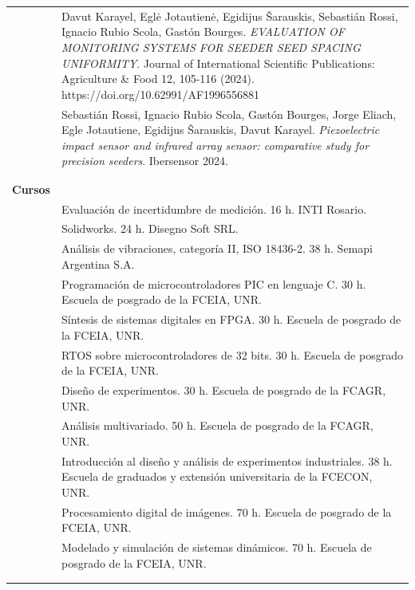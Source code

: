\documentclass[a4paper,10pt, sans]{article}
\begin{document}
  
  \begin{table}[H]
  \centering
  \begin{tabularx}{\textwidth}{r X}  
     
      {} & Davut Karayel, Eglė Jotautienė, Egidijus Šarauskis, Sebastián Rossi, Ignacio Rubio Scola, Gastón Bourges. \textit{EVALUATION OF MONITORING SYSTEMS FOR SEEDER SEED SPACING UNIFORMITY}. Journal of International Scientific Publications: Agriculture \& Food 12, 105-116 (2024). https://doi.org/10.62991/AF1996556881  \\  [1ex]
      {} & Sebastián Rossi, Ignacio Rubio Scola, Gastón Bourges, Jorge Eliach, Egle Jotautiene,
Egidijus Šarauskis, Davut Karayel. \textit{Piezoelectric impact sensor and infrared array sensor:
comparative study for precision seeders}. Ibersensor 2024. \\ \\ \hline \\
    

\textbf{Cursos} & {}\\ [1ex]
    
      {} & Evaluación de incertidumbre de medición. 16 h. INTI Rosario. \\ 
      {} & Solidworks. 24 h. Disegno Soft SRL. \\
      {} & Análisis de vibraciones, categoría II, ISO 18436-2. 38 h. Semapi Argentina S.A.\\
      {} & Programación de microcontroladores PIC en lenguaje C. 30 h. Escuela de posgrado de la FCEIA, UNR. \\
      {} & Síntesis de sistemas digitales en FPGA. 30 h. Escuela de posgrado de la FCEIA, UNR. \\
      {} & RTOS sobre microcontroladores de 32 bits. 30 h. Escuela de posgrado de la FCEIA, UNR. \\
      {} & Diseño de experimentos. 30 h. Escuela de posgrado de la FCAGR, UNR. \\
      {} & Análisis multivariado. 50 h. Escuela de posgrado de la FCAGR, UNR. \\
      {} & Introducción al diseño y análisis de experimentos industriales. 38 h. Escuela de graduados y extensión universitaria de la FCECON, UNR. \\
      {} & Procesamiento digital de imágenes. 70 h. Escuela de posgrado de la FCEIA, UNR. \\
      {} & Modelado y simulación de sistemas dinámicos. 70 h. Escuela de posgrado de la FCEIA, UNR. \\ \\ \hline \\
    

\end{tabularx}
\end{table}
\end{document}
